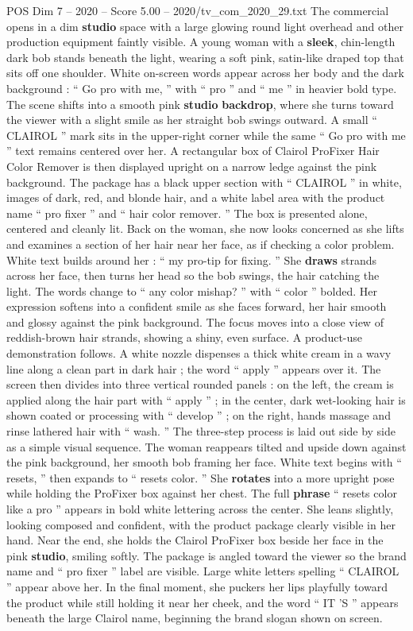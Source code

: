 \begin{textsample}{POS Dim 7 – 2020 – Score 5.00 – 2020/tv\_com\_2020\_29.txt}  \label{ex:f7_pos_089}
The commercial opens in a dim \textbf{studio} space with a large glowing round light overhead and other production equipment faintly visible.
A young woman with a \textbf{sleek}, chin-length dark bob stands beneath the light, wearing a soft pink, satin-like draped top that sits off one shoulder.
White on-screen words appear across her body and the dark background : “ Go pro with me, ” with “ pro ” and “ me ” in heavier bold type.
The scene shifts into a smooth pink \textbf{studio} \textbf{backdrop}, where she turns toward the viewer with a slight smile as her straight bob swings outward.
A small “ CLAIROL ” mark sits in the upper-right corner while the same “ Go pro with me ” text remains centered over her.
A rectangular box of Clairol ProFixer Hair Color Remover is then displayed upright on a narrow ledge against the pink background.
The package has a black upper section with “ CLAIROL ” in white, images of dark, red, and blonde hair, and a white label area with the product name “ pro fixer ” and “ hair color remover. ” The box is presented alone, centered and cleanly lit.
Back on the woman, she now looks concerned as she lifts and examines a section of her hair near her face, as if checking a color problem.
White text builds around her : “ my pro-tip for fixing. ” She \textbf{draws} strands across her face, then turns her head so the bob swings, the hair catching the light.
The words change to “ any color mishap? ” with “ color ” bolded.
Her expression softens into a confident smile as she faces forward, her hair smooth and glossy against the pink background.
The focus moves into a close view of reddish-brown hair strands, showing a shiny, even surface.
A product-use demonstration follows.
A white nozzle dispenses a thick white cream in a wavy line along a clean part in dark hair ; the word “ apply ” appears over it.
The screen then divides into three vertical rounded panels : on the left, the cream is applied along the hair part with “ apply ” ; in the center, dark wet-looking hair is shown coated or processing with “ develop ” ; on the right, hands massage and rinse lathered hair with “ wash. ” The three-step process is laid out side by side as a simple visual sequence.
The woman reappears tilted and upside down against the pink background, her smooth bob framing her face.
White text begins with “ resets, ” then expands to “ resets color. ” She \textbf{rotates} into a more upright pose while holding the ProFixer box against her chest.
The full \textbf{phrase} “ resets color like a pro ” appears in bold white lettering across the center.
She leans slightly, looking composed and confident, with the product package clearly visible in her hand.
Near the end, she holds the Clairol ProFixer box beside her face in the pink \textbf{studio}, smiling softly.
The package is angled toward the viewer so the brand name and “ pro fixer ” label are visible.
Large white letters spelling “ CLAIROL ” appear above her.
In the final moment, she puckers her lips playfully toward the product while still holding it near her cheek, and the word “ IT ’S ” appears beneath the large Clairol name, beginning the brand slogan shown on screen.

\end{textsample}
